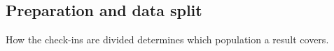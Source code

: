 
\subsection{Preparation and data split}
\label{sec:fund:split}

How the check-ins are divided determines which population a result covers.

